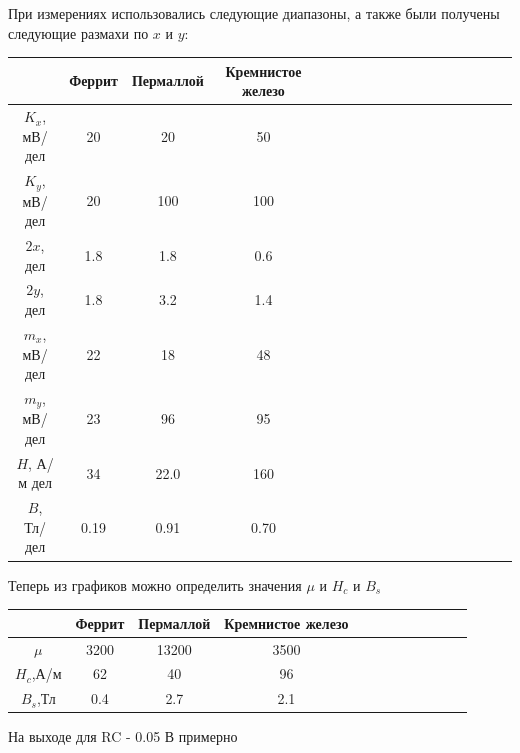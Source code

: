 \documentclass[14pt]{article}
\begin{document}
\vspace{1cm}
При измерениях использовались следующие диапазоны, а также были получены следующие размахи по $x$ и $y$:

\begin{center}
\begin{tabular}{|c|c|c|c|c|c|c|c|c|c|c|c|c|c|c|c|c|c|}
\hline
						&	Феррит		&	Пермаллой	&	Кремнистое железо	\\
\hline
$K_x$, мВ/дел			&	20			&	20			&	50					\\
\hline
$K_y$, мВ/дел			&	20			&	100			&	100					\\
\hline
$2x$, дел				&	1.8			&	1.8			&	0.6					\\
\hline
$2y$, дел				&	1.8			&	3.2			&	1.4					\\
\hline
$m_x$, мВ/дел			&	22			&	18			&	48					\\
\hline
$m_y$, мВ/дел			&	23			&	96			&	95					\\
\hline
$H$, А/м дел			&	34			&	22.0		&	160					\\
\hline
$B$, Тл/дел				&	0.19		&	0.91		&	0.70				\\
\hline
\end{tabular}
\end{center}

\vspace{1cm}
Теперь из графиков можно определить значения $\mu$ и $H_c$ и $B_s$

\begin{center}
\begin{tabular}{|c|c|c|c|c|c|c|c|c|c|c|c|}
\hline
			&	Феррит	&	Пермаллой	&	Кремнистое железо	\\
\hline
$\mu$		&	3200	&	13200		&	3500				\\
\hline
$H_c$,А/м	&	62		&	40			&	96					\\
\hline
$B_s$,Тл	&	0.4		&	2.7			&	2.1					\\
\hline
\end{tabular}
\end{center}

На выходе для RC - 0.05 В примерно
\end{document}
